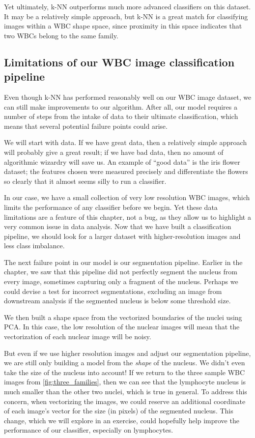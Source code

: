 Yet ultimately, k-NN outperforms much more advanced classifiers on this dataset. It may be a relatively simple approach, but k-NN is a great match for classifying images within a WBC shape space, since proximity in this space indicates that two WBCs belong to the same family.

\FloatBarrier
{}
\subsection{Limitations of our WBC image classification pipeline}

Even though k-NN has performed reasonably well on our WBC image dataset, we can still make improvements to our algorithm. After all, our model requires a number of steps from the intake of data to their ultimate classification, which means that several potential failure points could arise.

We will start with data. If we have great data, then a relatively simple approach will probably give a great result; if we have bad data, then no amount of algorithmic wizardry will save us. An example of ``good data'' is the iris flower dataset; the features chosen were measured precisely and differentiate the flowers so clearly that it almost seems silly to run a classifier.

In our case, we have a small collection of very low resolution WBC images, which limits the performance of any classifier before we begin. Yet these data limitations are a feature of this chapter, not a bug, as they allow us to highlight a very common issue in data analysis. Now that we have built a classification pipeline, we should look for a larger dataset with higher-resolution images and less class imbalance.

The next failure point in our model is our segmentation pipeline. Earlier in the chapter, we saw that this pipeline did not perfectly segment the nucleus from every image, sometimes capturing only a fragment of the nucleus. Perhaps we could devise a test for incorrect segmentations, excluding an image from downstream analysis if the segmented nucleus is below some threshold size.

We then built a shape space from the vectorized boundaries of the nuclei using PCA. In this case, the low resolution of the nuclear images will mean that the vectorization of each nuclear image will be noisy.

But even if we use higher resolution images and adjust our segmentation pipeline, we are still only building a model from the \textit{shape} of the nucleus. We didn't even take the size of the nucleus into account! If we return to the three sample WBC images from \autoref{fig:three_families}, then we can see that the lymphocyte nucleus is much smaller than the other two nuclei, which is true in general. To address this concern, when vectorizing the images, we could reserve an additional coordinate of each image's vector for the size (in pixels) of the segmented nucleus. This change, which we will explore in an exercise, could hopefully help improve the performance of our classifier, especially on lymphocytes.\\

